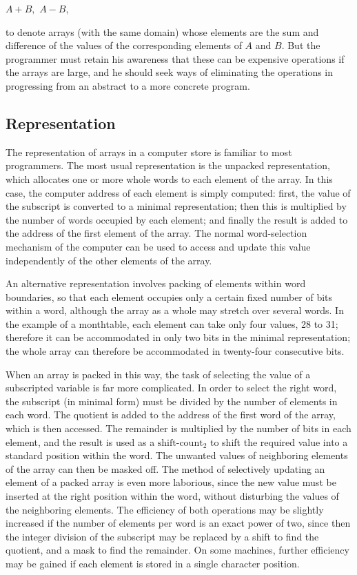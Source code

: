 \quad $A + B,$ $A - B$,

to denote arrays (with the same domain) whose elements are the sum and difference of the values of the corresponding elements of $A$ and $B$. But the programmer must retain his awareness that these can be expensive operations if the arrays are large, and he should seek ways of eliminating the operations in progressing from an abstract to a more concrete program.

\subsection{Representation}
\label{sec:representation-6.2}

The representation of arrays in a computer store is familiar to most programmers. The most usual representation is the unpacked representation, which allocates one or more whole words to each element of the array. In this case, the computer address of each element is simply computed: first, the value of the subscript is converted to a minimal representation; then this is multiplied by the number of words occupied by each element; and finally the result is added to the address of the first element of the array. The normal word-selection mechanism of the computer can be used to access and update this value independently of the other elements of the array.

An alternative representation involves packing of elements within word boundaries, so that each element occupies only a certain fixed number of bits within a word, although the array as a whole may stretch over several words. In the example of a monthtable, each element can take only four values, 28 to 31; therefore it can be accommodated in only two bits in the minimal representation; the whole array can therefore be accommodated in twenty-four consecutive bits.

When an array is packed in this way, the task of selecting the value of a subscripted variable is far more complicated. In order to select the right word, the subscript (in minimal form) must be divided by the number of elements in each word. The quotient is added to the address of the first word of the array, which is then accessed. The remainder is multiplied by the number of bits in each element, and the result is used as a $\text{shift-count}_2$ to shift the required value into a standard position within the word. The unwanted values of neighboring elements of the array can then be masked off. The method of selectively updating an element of a packed array is even more laborious, since the new value must be inserted at the right position within the word, without disturbing the values of the neighboring elements. The efficiency of both operations may be slightly increased if the number of elements per word is an exact power of two, since then the integer division of the subscript may be replaced by a shift to find the quotient, and a mask to find the remainder. On some machines, further efficiency may be gained if each element is stored in a single character position.

